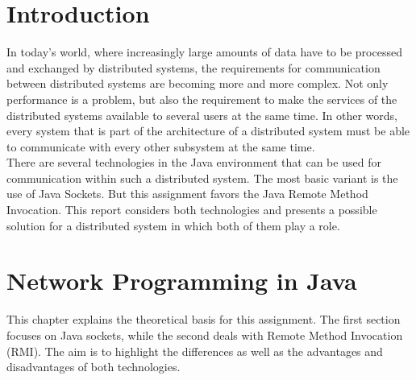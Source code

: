 \lstset{language=Java, numbers=left, numberstyle=\tiny, stepnumber=2, numbersep=5pt}
\chapter{Introduction}
\label{intro}
In today's world, where increasingly large amounts of data have to be processed and exchanged by distributed systems, the requirements for communication between distributed systems are becoming more and more complex. Not only performance is a problem, but also the requirement to make the services of the distributed systems available to several users at the same time. In other words, every system that is part of the architecture of a distributed system must be able to communicate with every other subsystem at the same time.\\
There are several technologies in the Java environment that can be used for communication within such a distributed system. The most basic variant is the use of Java Sockets. But this assignment favors the Java Remote Method Invocation. This report considers both technologies and presents a possible solution for a distributed system in which both of them play a role.
\chapter{Network Programming in Java}
\label{network-programming}
This chapter explains the theoretical basis for this assignment. The first section focuses on Java sockets, while the second deals with Remote Method Invocation (RMI). The aim is to highlight the differences as well as the advantages and disadvantages of both technologies.
